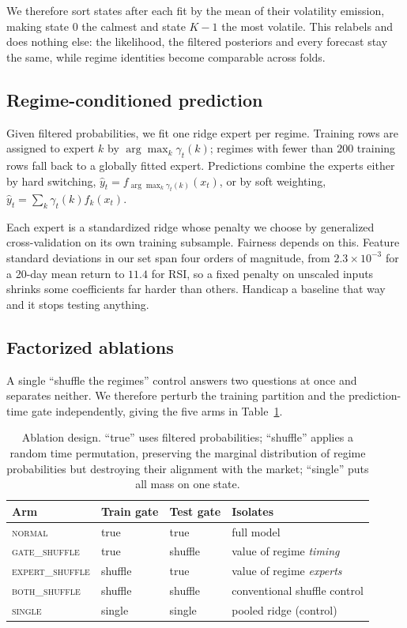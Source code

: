 \documentclass[sigconf,nonacm]{acmart}
\begin{document}
We therefore sort states after each fit by the mean of their volatility emission,
making state $0$ the calmest and state $K-1$ the most volatile. This relabels and
does nothing else: the likelihood, the filtered posteriors and every forecast
stay the same, while regime identities become comparable across folds.

\subsection{Regime-conditioned prediction}

Given filtered probabilities, we fit one ridge expert per regime. Training rows
are assigned to expert $k$ by $\arg\max_k \gamma_t(k)$; regimes with fewer than
$200$ training rows fall back to a globally fitted expert. Predictions combine
the experts either by hard switching,
$\hat{y}_t = f_{\arg\max_k \gamma_t(k)}(x_t)$, or by soft weighting,
$\hat{y}_t = \sum_k \gamma_t(k) f_k(x_t)$.

Each expert is a standardized ridge whose penalty we choose by generalized
cross-validation on its own training subsample. Fairness depends on this.
Feature standard deviations in our set span four orders of magnitude, from
$2.3\times10^{-3}$ for a 20-day mean return to $11.4$ for RSI, so a fixed penalty
on unscaled inputs shrinks some coefficients far harder than others. Handicap a
baseline that way and it stops testing anything.

\subsection{Factorized ablations}
\label{sec:ablations}

A single ``shuffle the regimes'' control answers two questions at once and
separates neither. We therefore perturb the training partition and the
prediction-time gate independently, giving the five arms in
Table~\ref{tab:ablation-design}.

\begin{table}[t]
\caption{Ablation design. ``true'' uses filtered probabilities; ``shuffle''
applies a random time permutation, preserving the marginal distribution of
regime probabilities but destroying their alignment with the market; ``single''
puts all mass on one state.}
\label{tab:ablation-design}
\small
\begin{tabular}{llll}
\toprule
Arm & Train gate & Test gate & Isolates \\
\midrule
\textsc{normal}         & true    & true    & full model \\
\textsc{gate\_shuffle}  & true    & shuffle & value of regime \emph{timing} \\
\textsc{expert\_shuffle}& shuffle & true    & value of regime \emph{experts} \\
\textsc{both\_shuffle}  & shuffle & shuffle & conventional shuffle control \\
\textsc{single}         & single  & single  & pooled ridge (control) \\
\bottomrule
\end{tabular}
\end{table}
\end{document}
